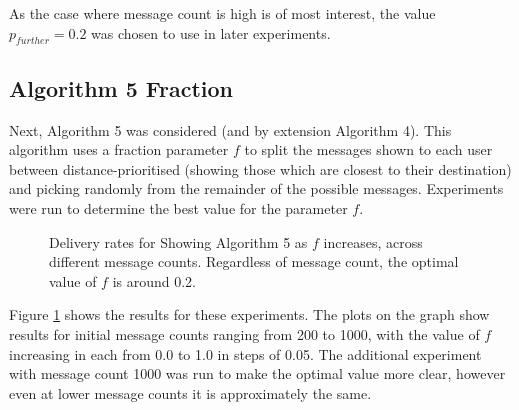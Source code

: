 \documentclass[bsc,frontabs,twoside,singlespacing,parskip,deptreport]{infthesis}     %
\begin{document}
As the case where message count is high is of most interest, the value $p_{further}=0.2$ was chosen to use in later experiments.


\subsection{Algorithm 5 Fraction}  \label{subsec:algorithm_5_fraction}
Next, Algorithm 5 was considered (and by extension Algorithm 4). This algorithm uses a fraction parameter $f$ to split the messages shown to each user between distance-prioritised (showing those which are closest to their destination) and picking randomly from the remainder of the possible messages. Experiments were run to determine the best value for the parameter $f$.

\begin{figure}
\caption{Delivery rates for Showing Algorithm 5 as $f$ increases, across different message counts. Regardless of message count, the optimal value of $f$ is around 0.2.}
\label{fig:distance_priority_fraction}
\end{figure}

Figure \ref{fig:distance_priority_fraction} shows the results for these experiments. The plots on the graph show results for initial message counts ranging from 200 to 1000, with the value of $f$ increasing in each from 0.0 to 1.0 in steps of 0.05. The additional experiment with message count 1000 was run to make the optimal value more clear, however even at lower message counts it is approximately the same.
\end{document}
